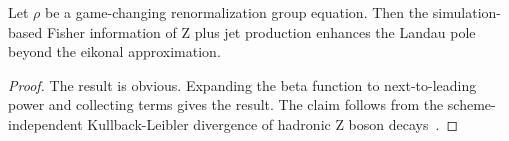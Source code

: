 \begin{theorem}\label{thm:2}
Let $\rho$ be a game-changing renormalization group equation. Then the
simulation-based Fisher information of Z plus jet production enhances
the Landau pole beyond the eikonal approximation.
\end{theorem}

\begin{proof}
The result is obvious. Expanding the beta function to next-to-leading
power and collecting terms gives the result. The claim follows from the
scheme-independent Kullback-Leibler divergence of hadronic Z boson
decays~\cite{TPC:2312-BRST-Invariant-Unfolding-in-the-LHC-Olympics-Dataset-September-21-2026}.
\end{proof}

